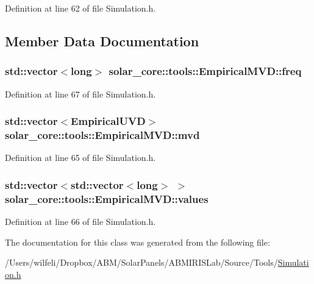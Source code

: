Definition at line 62 of file Simulation.\+h.



\subsection{Member Data Documentation}
\hypertarget{classsolar__core_1_1tools_1_1_empirical_m_v_d_a637f45117b7ed5d52beac351440c3805}{}
\subsubsection[{freq}]{\setlength{\rightskip}{0pt plus 5cm}std\+::vector$<$long$>$ solar\+\_\+core\+::tools\+::\+Empirical\+M\+V\+D\+::freq}\label{classsolar__core_1_1tools_1_1_empirical_m_v_d_a637f45117b7ed5d52beac351440c3805}


Definition at line 67 of file Simulation.\+h.

\hypertarget{classsolar__core_1_1tools_1_1_empirical_m_v_d_aa83e37773da6c4f70e2c7218b439ef21}{}
\subsubsection[{mvd}]{\setlength{\rightskip}{0pt plus 5cm}std\+::vector$<${\bf Empirical\+U\+V\+D}$>$ solar\+\_\+core\+::tools\+::\+Empirical\+M\+V\+D\+::mvd}\label{classsolar__core_1_1tools_1_1_empirical_m_v_d_aa83e37773da6c4f70e2c7218b439ef21}


Definition at line 65 of file Simulation.\+h.

\hypertarget{classsolar__core_1_1tools_1_1_empirical_m_v_d_ac5fe45bde609ac9cc2dd6d3e7121ce48}{}
\subsubsection[{values}]{\setlength{\rightskip}{0pt plus 5cm}std\+::vector$<$std\+::vector$<$long$>$ $>$ solar\+\_\+core\+::tools\+::\+Empirical\+M\+V\+D\+::values}\label{classsolar__core_1_1tools_1_1_empirical_m_v_d_ac5fe45bde609ac9cc2dd6d3e7121ce48}


Definition at line 66 of file Simulation.\+h.



The documentation for this class was generated from the following file\+:\begin{DoxyCompactItemize}
\item 
/\+Users/wilfeli/\+Dropbox/\+A\+B\+M/\+Solar\+Panels/\+A\+B\+M\+I\+R\+I\+S\+Lab/\+Source/\+Tools/\hyperlink{_simulation_8h}{Simulation.\+h}\end{DoxyCompactItemize}
